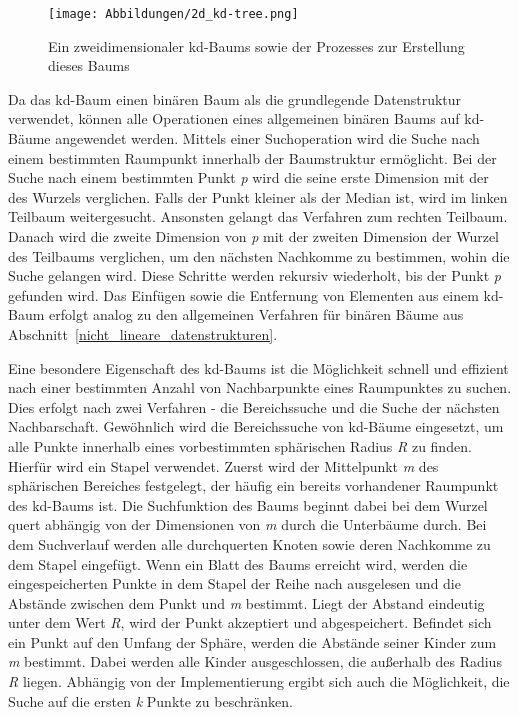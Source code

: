 
\begin{figure}[!b]
	\texttt{[image: Abbildungen/2d\_kd-tree.png]}
	\centering
	\caption[kd-Baum]{Ein zweidimensionaler kd-Baums sowie der Prozesses zur Erstellung dieses Baums \autocite[60]{garcia-garcia_alberto_towards_2015}}
	\label{fig: kd-tree_creation}
\end{figure}

Da das kd-Baum einen binären Baum als die grundlegende Datenstruktur verwendet, können alle Operationen eines allgemeinen binären Baums auf kd-Bäume angewendet werden. Mittels einer Suchoperation wird die Suche nach einem bestimmten Raumpunkt innerhalb der Baumstruktur ermöglicht. Bei der Suche nach einem bestimmten Punkt \textit{p} wird die seine erste Dimension mit der des Wurzels verglichen. Falls der Punkt kleiner als der Median ist, wird im linken Teilbaum weitergesucht. Ansonsten gelangt das Verfahren zum rechten Teilbaum. Danach wird die zweite Dimension von \textit{p} mit der zweiten Dimension der Wurzel des Teilbaums verglichen, um den nächsten Nachkomme zu bestimmen, wohin die Suche gelangen wird. Diese Schritte werden rekursiv wiederholt, bis der Punkt \textit{p} gefunden wird. Das Einfügen sowie die Entfernung von Elementen aus einem kd-Baum erfolgt analog zu den allgemeinen Verfahren für binären Bäume aus Abschnitt~\ref{nicht_lineare_datenstrukturen}. \autocite[94]{saha_advanced_2019}

Eine besondere Eigenschaft des kd-Baums ist die Möglichkeit schnell und effizient nach einer bestimmten Anzahl von Nachbarpunkte eines Raumpunktes zu suchen. Dies erfolgt nach zwei Verfahren - die Bereichssuche und die Suche der nächsten Nachbarschaft. Gewöhnlich wird die Bereichssuche von kd-Bäume eingesetzt, um alle Punkte innerhalb eines vorbestimmten sphärischen Radius \textit{R} zu finden. Hierfür wird ein Stapel verwendet. Zuerst wird der Mittelpunkt \textit{m} des sphärischen Bereiches festgelegt, der häufig ein bereits vorhandener Raumpunkt des kd-Baums ist. Die Suchfunktion des Baums beginnt dabei bei dem Wurzel quert abhängig von der Dimensionen von \textit{m} durch die Unterbäume durch. Bei dem Suchverlauf werden alle durchquerten Knoten sowie deren Nachkomme zu dem Stapel eingefügt. Wenn ein Blatt des Baums erreicht wird, werden die eingespeicherten Punkte in dem Stapel der Reihe nach ausgelesen und die Abstände zwischen dem Punkt und \textit{m} bestimmt. Liegt der Abstand eindeutig unter dem Wert \textit{R}, wird der Punkt akzeptiert und abgespeichert. Befindet sich ein Punkt auf den Umfang der Sphäre, werden die Abstände seiner Kinder zum \textit{m} bestimmt. Dabei werden alle Kinder ausgeschlossen, die außerhalb des Radius \textit{R} liegen. Abhängig von der Implementierung ergibt sich auch die Möglichkeit, die Suche auf die ersten \textit{k} Punkte zu beschränken. \autocite[95]{saha_advanced_2019}

